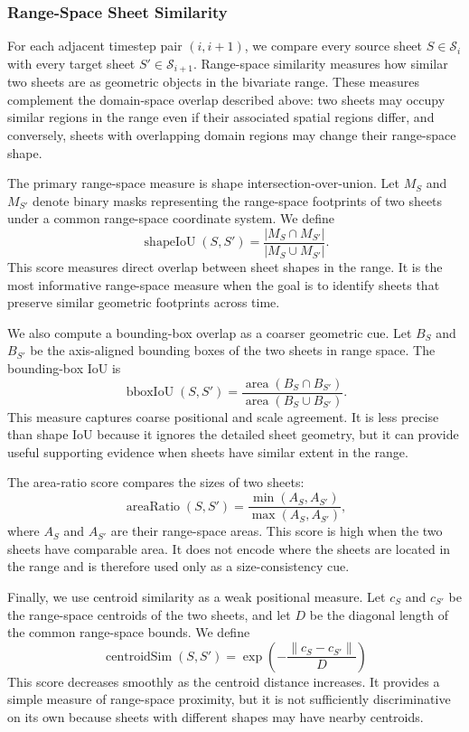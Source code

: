 \documentclass{vgtc}                          %
\newcommand{\Sheets}{\mathcal{S}}
\newcommand{\Sheet}{S}
\begin{document}
\subsubsection{Range-Space Sheet Similarity}

For each adjacent timestep pair $(i,i+1)$, we compare every source sheet $\Sheet\in\Sheets_i$ with every target sheet $\Sheet'\in\Sheets_{i+1}$. Range-space similarity measures how similar two sheets are as geometric objects in the bivariate range. These measures complement the domain-space overlap described above: two sheets may occupy similar regions in the range even if their associated spatial regions differ, and conversely, sheets with overlapping domain regions may change their range-space shape.

The primary range-space measure is shape intersection-over-union. Let $M_\Sheet$ and $M_{\Sheet'}$ denote binary masks representing the range-space footprints of two sheets under a common range-space coordinate system. We define
\[
\operatorname{shapeIoU}(\Sheet,\Sheet') =
\frac{|M_\Sheet\cap M_{\Sheet'}|}{|M_\Sheet\cup M_{\Sheet'}|}.
\]
This score measures direct overlap between sheet shapes in the range. It is the most informative range-space measure when the goal is to identify sheets that preserve similar geometric footprints across time.

We also compute a bounding-box overlap as a coarser geometric cue. Let $B_\Sheet$ and $B_{\Sheet'}$ be the axis-aligned bounding boxes of the two sheets in range space. The bounding-box IoU is
\[
\operatorname{bboxIoU}(\Sheet,\Sheet') =
\frac{\operatorname{area}(B_\Sheet\cap B_{\Sheet'})}
{\operatorname{area}(B_\Sheet\cup B_{\Sheet'})}.
\]
This measure captures coarse positional and scale agreement. It is less precise than shape IoU because it ignores the detailed sheet geometry, but it can provide useful supporting evidence when sheets have similar extent in the range.

The area-ratio score compares the sizes of two sheets:
\[
\operatorname{areaRatio}(\Sheet,\Sheet') =
\frac{\min(A_\Sheet,A_{\Sheet'})}{\max(A_\Sheet,A_{\Sheet'})},
\]
where $A_\Sheet$ and $A_{\Sheet'}$ are their range-space areas. This score is high when the two sheets have comparable area. It does not encode where the sheets are located in the range and is therefore used only as a size-consistency cue.

Finally, we use centroid similarity as a weak positional measure. Let $c_\Sheet$ and $c_{\Sheet'}$ be the range-space centroids of the two sheets, and let $D$ be the diagonal length of the common range-space bounds. We define
\[
\operatorname{centroidSim}(\Sheet,\Sheet') =
\exp\left(-\frac{\|c_\Sheet-c_{\Sheet'}\|}{D}\right)
\]
This score decreases smoothly as the centroid distance increases. It provides a simple measure of range-space proximity, but it is not sufficiently discriminative on its own because sheets with different shapes may have nearby centroids.
\end{document}
